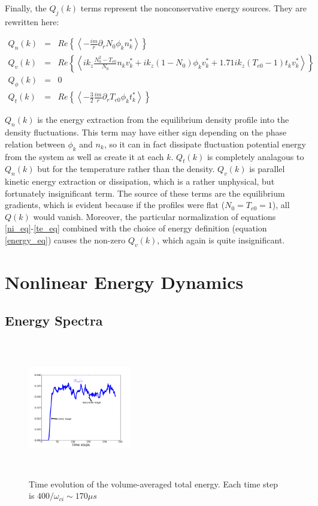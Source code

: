\documentclass[showpacs,preprintnumbers,amsmath,amssymb,superscriptaddress]{revtex4}
\def\beqar{\begin{eqnarray}}
\def\eeqar{\end{eqnarray}}
\newcommand{\pdr}{\partial_r}
\begin{document}
Finally, the $Q_j(k)$ terms represent the nonconservative energy sources. They are rewritten here:

\beqar
Q_n(k) & = & Re \left\{ \left< -\frac{i m}{r} \pdr N_0 \phi_k n_k^*  \right> \right\}
\label{Qnk} \\
Q_v(k) & = & Re \left\{ \left<  i k_z \frac{N_0^2 - T_{e0}}{N_0} n_k v_k^* + i k_z (1 - N_0) \phi_k v_k^* + 1.71 i k_z (T_{e0} -1) t_k v_k^*  \right> \right\}
\label{Qvk} \\
Q_\phi(k) & = & 0
\label{Qpk} \\
Q_t(k) & = & Re \left\{ \left< -\frac{3}{2} \frac{i m}{r} \pdr T_{e0} \phi_k t_k^*  \right> \right\}
\label{Qtk}
\eeqar

$Q_n(k)$ is the energy extraction from the equilibrium density profile into the density fluctuations. 
This term may have either sign depending on the phase relation between $\phi_k$ and $n_k$, so it can in fact dissipate fluctuation potential energy from the system as well as create it
at each $k$. $Q_t(k)$ is completely analagous to $Q_n(k)$ but for the temperature rather than the density. 
$Q_v(k)$ is parallel kinetic energy extraction or dissipation, which is a rather unphysical, but fortunately insignificant term.
The source of these terms are the equilibrium gradients, which is evident because if the profiles
were flat ($N_0=T_{e0}=1$), all $Q(k)$ would vanish.
Moreover, the particular normalization of equations \ref{ni_eq}-\ref{te_eq} combined with the choice of energy definition (equation \ref{energy_eq}) causes the non-zero $Q_v(k)$, which again
is quite insignificant.


\section{Nonlinear Energy Dynamics}
\label{nl_en_dynamics_sec}

\subsection{Energy Spectra}

\begin{figure}
\includegraphics[width=0.40\textwidth,height=60mm]{time_evolution}
\hfil
\caption{Time evolution of the volume-averaged total energy. Each time step is $400/\omega_{ci} \sim 170 \mu s$}
\label{time_evolution}
\end{figure}
\end{document}
